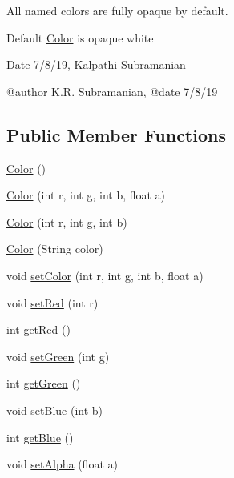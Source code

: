 All named colors are fully opaque by default.

Default \mbox{\hyperlink{classbridges_1_1base_1_1_color}{Color}} is opaque white

\begin{DoxyDate}{Date}
7/8/19, Kalpathi Subramanian
\end{DoxyDate}
\begin{DoxyVerb}@author K.R. Subramanian,
@date 7/8/19\end{DoxyVerb}
 \subsection*{Public Member Functions}
\begin{DoxyCompactItemize}
\item 
\mbox{\hyperlink{classbridges_1_1base_1_1_color_ab6d71ac2ee1430fb2db2fbe34e692de8}{Color}} ()
\item 
\mbox{\hyperlink{classbridges_1_1base_1_1_color_a15f56590ca3c9cc161c7bfa47060ad21}{Color}} (int r, int g, int b, float a)
\item 
\mbox{\hyperlink{classbridges_1_1base_1_1_color_a5fab564fa4eec8bece64f847ebd42948}{Color}} (int r, int g, int b)
\item 
\mbox{\hyperlink{classbridges_1_1base_1_1_color_a5cb17fdf8eddf44fc0763ceb7d4d833b}{Color}} (String color)
\item 
void \mbox{\hyperlink{classbridges_1_1base_1_1_color_a5559b1c7eb4c3901526b1012029b528f}{set\+Color}} (int r, int g, int b, float a)
\item 
void \mbox{\hyperlink{classbridges_1_1base_1_1_color_a1d78967703924b709e76def5b2b3ee9a}{set\+Red}} (int r)
\item 
int \mbox{\hyperlink{classbridges_1_1base_1_1_color_af1a30dc925b35d6bfe609f8838651025}{get\+Red}} ()
\item 
void \mbox{\hyperlink{classbridges_1_1base_1_1_color_a415a28133ade4e216c02ecdfc8a32a1d}{set\+Green}} (int g)
\item 
int \mbox{\hyperlink{classbridges_1_1base_1_1_color_a8f3fdd23cf785704faa2e3701e25978f}{get\+Green}} ()
\item 
void \mbox{\hyperlink{classbridges_1_1base_1_1_color_a0e04156b1573cf8002c4d9cb69825657}{set\+Blue}} (int b)
\item 
int \mbox{\hyperlink{classbridges_1_1base_1_1_color_ad4b82e1eb9ff59857d2868edd8d4ce65}{get\+Blue}} ()
\item 
void \mbox{\hyperlink{classbridges_1_1base_1_1_color_afab07ce64efa1fa5797795670b0effb6}{set\+Alpha}} (float a)

\end{DoxyCompactItemize}

